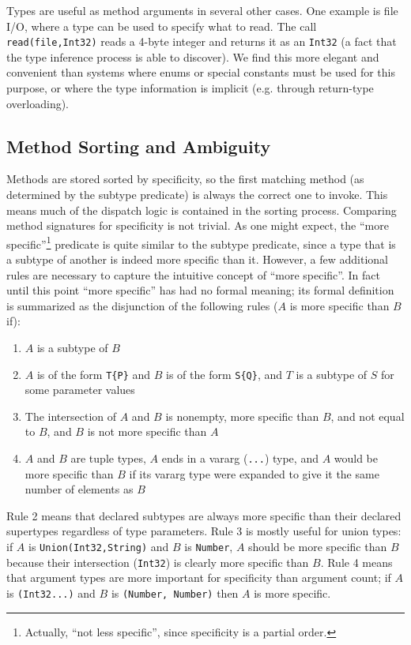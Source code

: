 \documentclass[9pt]{sigplanconf}
\begin{document}
Types are useful as method arguments in several other cases. One example is
file I/O, where a type can be used to specify what to read. The call
{\tt read(file,Int32)} reads a 4-byte integer and returns it as an {\tt Int32}
(a fact that the type inference process is able to discover). We find this
more elegant and convenient than systems where enums or special constants must
be used for this purpose, or where the type information is implicit
(e.g. through return-type overloading).


\subsection{Method Sorting and Ambiguity}
Methods are stored sorted by specificity, so the first matching method
(as determined by the subtype predicate) is always the correct one to invoke.
This means much of the dispatch logic is contained in the sorting process.
Comparing method signatures for specificity is not trivial. As one might
expect, the ``more specific''\footnote{Actually, ``not less specific'',
since specificity is a partial order.}
predicate is quite similar to the subtype
predicate, since a type that is a subtype of another is indeed more specific
than it. However, a few additional rules are necessary to capture the
intuitive concept of ``more specific''. In fact until this point
``more specific'' has had no formal meaning; its formal definition is
summarized as the disjunction of the following rules ($A$ is more specific
than $B$ if):

\begin{enumerate}
\item $A$ is a subtype of $B$
\item $A$ is of the form {\tt T\{P\}} and $B$ is of the form {\tt S\{Q\}}, and
$T$ is a subtype of $S$ for some parameter values
\item The intersection of $A$ and $B$ is nonempty, more specific than $B$, and
not equal to $B$, and $B$ is not more specific than $A$
\item $A$ and $B$ are tuple types, $A$ ends in a vararg ({\tt ...}) type,
and $A$ would be more specific than $B$ if its vararg type were expanded to
give it the same number of elements as $B$
\end{enumerate}

Rule 2 means that declared subtypes are always more specific than their
declared supertypes regardless of type parameters. Rule 3 is mostly useful for
union types: if $A$ is {\tt Union(Int32,String)} and $B$ is {\tt Number}, $A$
should
be more specific than $B$ because their intersection ({\tt Int32}) is clearly
more specific than $B$. Rule 4 means that argument types are more important for
specificity than argument count; if $A$ is {\tt (Int32...)} and $B$ is
{\tt (Number, Number)} then $A$ is more specific.
\end{document}
